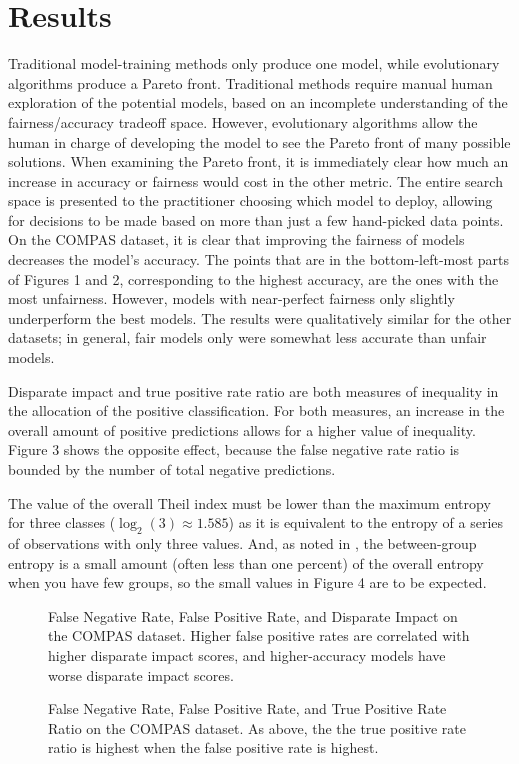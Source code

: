 \documentclass[10pt]{acmart}
\newcommand{\figures}[4]{
	\begin{figure}{
		\centering{
			\texttt{[image: \#1]}
		}
		\caption{#2}
		}
	\end{figure}
	\begin{figure} {
		\centering{
			\texttt{[image: \#3]}
		}
		\caption{#4}
	}
	\end{figure}
}
\begin{document}
\section{Results}
Traditional model-training methods only produce one model, while evolutionary algorithms produce a Pareto front. Traditional methods require manual human exploration of the potential models, based on an incomplete understanding of the fairness/accuracy tradeoff space. However, evolutionary algorithms allow the human in charge of developing the model to see the Pareto front of many possible solutions. When examining the Pareto front, it is immediately clear how much an increase in accuracy or fairness would cost in the other metric. The entire search space is presented to the practitioner choosing which model to deploy, allowing for decisions to be made based on more than just a few hand-picked data points.
On the COMPAS dataset, it is clear that improving the fairness of models decreases the model’s accuracy. The points that are in the bottom-left-most parts of Figures 1 and 2, corresponding to the highest accuracy, are the ones with the most unfairness. However, models with near-perfect fairness only slightly underperform the best models. The results were qualitatively similar for the other datasets; in general, fair models only were somewhat less accurate than unfair models.

Disparate impact and true positive rate ratio are both measures of inequality in the allocation of the positive classification. For both measures, an increase in the overall amount of positive predictions allows for a higher value of inequality. Figure 3 shows the opposite effect, because the false negative rate ratio is bounded by the number of total negative predictions.

The value of the overall Theil index must be lower than the maximum entropy for three classes ($\log_2(3) \approx 1.585$) as it is equivalent to the entropy of a series of observations with only three values. And, as noted in \citep{Speicher:2018}, the between-group entropy is a small amount (often less than one percent) of the overall entropy when you have few groups, so the small values in Figure 4 are to be expected.

\figures{Disparate Impact|COMPAS.png}{False Negative Rate, False Positive Rate, and Disparate Impact on the COMPAS dataset. Higher false positive rates are correlated with higher disparate impact scores, and higher-accuracy models have worse disparate impact scores.}{TPR Ratio|COMPAS.png}{False Negative Rate, False Positive Rate, and True Positive Rate Ratio on the COMPAS dataset. As above, the the true positive rate ratio is highest when the false positive rate is highest.}
\end{document}
